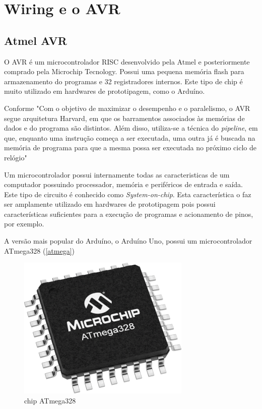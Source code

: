 \chapter{Wiring e o AVR}

\section{Atmel AVR}

O AVR é um microcontrolador RISC desenvolvido pela Atmel e posteriormente comprado pela Microchip Tecnology. Possui uma pequena memória flash para armazenamento do programas e 32 registradores internos. Este tipo de chip é muito utilizado em hardwares de prototipagem, como o Arduíno.

Conforme  "Com o objetivo de maximizar o desempenho e o paralelismo, o AVR segue arquitetura Harvard, em que os barramentos associados às memórias de dados e do programa são distintos. Além disso, utiliza-se a técnica do \emph{pipeline}, em que, enquanto uma instrução começa a ser executada, uma outra já é buscada na memória de programa para que a mesma possa ser executada no próximo ciclo de relógio"

Um microcontrolador possui internamente todas as caracteristicas de um computador possuindo processador, memória e periféricos de entrada e saída. Este tipo de circuito é conhecido como \emph{System-on-chip}. Esta característica o faz ser amplamente utilizado em hardwares de prototipagem pois possui características suficientes para a execução de programas e acionamento de pinos, por exemplo.

A versão mais popular do Arduíno, o Arduíno Uno, possui um microcontrolador ATmega328 (\autoref{atmega})

\begin{figure}[htb]
	\begin{center}
	    \includegraphics[scale=0.5]{artigo/refs/medium-ATmega328-TQFP-32.png}
	\end{center}
	\caption{\label{atmega}chip ATmega328}
\end{figure}

